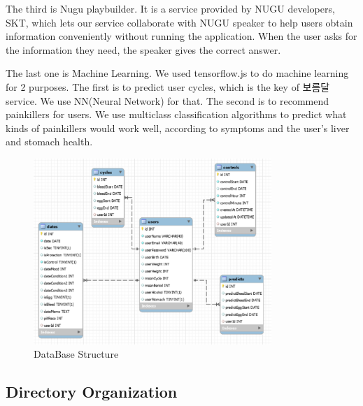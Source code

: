 \documentclass[conference]{IEEEtran}
\begin{document}
The third is Nugu playbuilder. It is a service provided by NUGU developers, SKT, which lets our service collaborate with NUGU speaker to help users obtain information conveniently without running the application. When the user asks for the information they need, the speaker gives the correct answer.

The last one is Machine Learning. We used tensorflow.js to do machine learning for 2 purposes. The first is to predict user cycles, which is the key of 보름달 service. We use NN(Neural Network) for that. The second is to recommend painkillers for users. We use multiclass classification algorithms to predict what kinds of painkillers would work well, according to symptoms and the user's liver and stomach health.
\begin{figure}[ht]
\includegraphics[width=9cm, center]{DBstr.png}
\caption{DataBase Structure}
\label{fig44}
\end{figure}

\subsection{Directory Organization}
\end{document}
